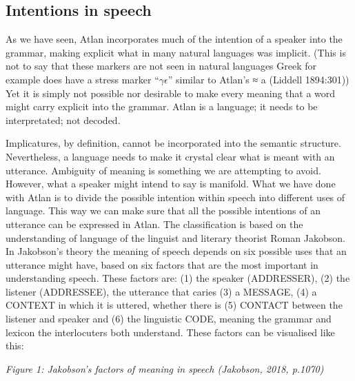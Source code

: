 \vspace{-0.2cm}
\subsection{Intentions in speech}

As we have seen, Atlan incorporates much of the intention of a speaker into the grammar, making explicit what in many natural languages was implicit. (This is not to say that these markers are not seen in natural languages Greek for example does have a stress marker “$\gamma\epsilon$” similar to Atlan’s \Atlana ≈ a (Liddell 1894:301)) Yet it is simply not possible nor desirable to make every meaning that a word might carry explicit into the grammar. Atlan is a language; it needs to be interpretated; not decoded.

Implicatures, by definition, cannot be incorporated into the semantic structure. Nevertheless, a language needs to make it crystal clear what is meant with an utterance. Ambiguity of meaning is something we are attempting to avoid. However, what a speaker might intend to say is manifold. What we have done with Atlan is to divide the possible intention within speech into different uses of language. This way we can make sure that all the possible intentions of an utterance can be expressed in Atlan. The classification is based on the understanding of language of the linguist and literary theorist Roman Jakobson. In Jakobson's theory the meaning of speech depends on six possible uses that an utterance might have, based on six factors that are the most important in understanding speech. These factors are: (1) the speaker (ADDRESSER), (2) the listener (ADDRESSEE), the utterance that caries (3) a MESSAGE, (4) a CONTEXT in which it is uttered, whether there is (5) CONTACT between the listener and speaker and (6) the linguistic CODE, meaning the grammar and lexicon the interlocuters both understand. These factors can be visualised like this:

\small
{}
\normalsize

\vspace{-.1cm}
{\it \footnotesize Figure 1: Jakobson's factors of meaning in speech (Jakobson, 2018, p.1070)}
\vspace{0.3cm}

